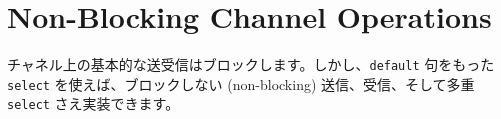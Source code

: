 \section{Non-Blocking Channel Operations}

チャネル上の基本的な送受信はブロックします。しかし、\texttt{default} 句をもった \texttt{select} を使えば、ブロックしない (non-blocking) 送信、受信、そして多重 \texttt{select} さえ実装できます。




